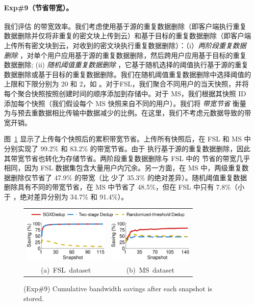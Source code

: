 \paragraph{Exp\#9（节省带宽）。} 我们评估 \sysname 的带宽效率。我们考虑使用基于源的重复数据删除（即客户端执行重复数据删除并仅将非重复的密文块上传到云）和基于目标的重复数据删除（即客户端上传所有密文块到云，对收到的密文块执行重复数据删除）：（i）{\em 两阶段重复数据删除} \cite{li15}，对单个用户应用基于源的重复数据删除，然后跨用户应用基于目标的重复数据删除; (ii) {\em 随机阈值重复数据删除} \cite{harnik10}，它基于随机选择的阈值执行基于源的重复数据删除或基于目标的重复数据删除。我们在随机阈值重复数据删除中选择阈值的上限和下限分别为 20 和 2，如 \cite{harnik10}。对于FSL，我们聚合不同用户的当天快照，并将每个聚合快照按照创建时间的顺序添加到存储中。对于 MS，我们根据其快照 ID 添加每个快照（我们假设每个 MS 快照来自不同的用户）。我们将 {\em 带宽节省} 衡量为与预去重数据相比传输中数据减少的比例。在这里，我们不考虑元数据导致的带宽开销。

图~\ref{fig:uploadTraffic} 显示了上传每个快照后的累积带宽节省。上传所有快照后，\sysname 在 FSL 和 MS 中分别实现了 99.2\% 和 83.2\% 的带宽节省。由于 \sysname 执行基于源的重复数据删除，因此其带宽节省也转化为存储节省。两阶段重复数据删除与 FSL 中的 \sysname 节省的带宽几乎相同，因为 FSL 数据集包含大量用户内冗余。另一方面，在 MS 中，两级重复数据删除仅节省了 47.9\% 的带宽（比 \sysname 少了 35.3\% 的绝对差异）。随机阈值重复数据删除具有不同的带宽节省，在 MS 中节省了 48.5\%，但在 FSL 中只有 7.8\%（小于 \sysname，绝对差异分别为 34.7\% 和 91.4\%）。

\begin{figure}[t]
\centering
\begin{tabular}{@{\ }c@{\ }c}
\multicolumn{2}{c}{\includegraphics[width=3.25in]{pic/sgxdedup/upload_traffic_legend.pdf}} \\
\hspace{-0.1in}
\includegraphics[width=1.65in]{pic/sgxdedup/upload_traffic_fsl.pdf} &
\includegraphics[width=1.65in]{pic/sgxdedup/upload_traffic_ms.pdf}
\vspace{-3pt}\\ 
\mbox{\small (a) FSL dataset} &
\mbox{\small (b) MS dataset}
\end{tabular}
\vspace{-6pt}
\caption{(Exp\#9) Cumulative bandwidth savings after each snapshot is stored.}
\label{fig:uploadTraffic}
\end{figure}

